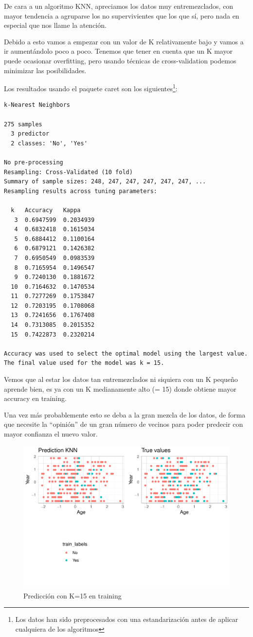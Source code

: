 De cara a un algoritmo KNN, apreciamos los datos muy entremezclados, con mayor tendencia a agruparse los no supervivientes que los que sí, pero nada en especial que nos llame la atención.

\vspace{\baselineskip}

Debido a esto vamos a empezar con un valor de K relativamente bajo y vamos a ir aumentándolo poco a poco. Tenemos que tener en cuenta que un K mayor puede ocasionar overfitting, pero usando técnicas de cross-validation podemos minimizar las posibilidades.

Los resultados usando el paquete caret son los siguientes\footnote{Los datos han sido preprocesados con una estandarización antes de aplicar cualquiera de los algoritmos}:
\begin{verbatim}
k-Nearest Neighbors 

275 samples
  3 predictor
  2 classes: 'No', 'Yes' 

No pre-processing
Resampling: Cross-Validated (10 fold) 
Summary of sample sizes: 248, 247, 247, 247, 247, 247, ... 
Resampling results across tuning parameters:

  k   Accuracy   Kappa    
   3  0.6947599  0.2034939
   4  0.6832418  0.1615034
   5  0.6884412  0.1100164
   6  0.6879121  0.1426382
   7  0.6950549  0.0983539
   8  0.7165954  0.1496547
   9  0.7240130  0.1881672
  10  0.7164632  0.1470534
  11  0.7277269  0.1753847
  12  0.7203195  0.1708068
  13  0.7241656  0.1767408
  14  0.7313085  0.2015352
  15  0.7422873  0.2320214

Accuracy was used to select the optimal model using the largest value.
The final value used for the model was k = 15.
\end{verbatim}

Vemos que al estar los datos tan entremezclados ni siquiera con un K pequeño aprende bien, es ya con un K medianamente alto (= 15) donde obtiene mayor accuracy en training.

Una vez más probablemente esto se deba a la gran mezcla de los datos, de forma que necesite la ``opinión'' de un gran número de vecinos para poder predecir con mayor confianza el nuevo valor.

\begin{figure}[H]\center\includegraphics[width=.9\linewidth]{img/Clasificacion_files/figure-latex/unnamed-chunk-10-1}\caption{Predicción con K=15 en training}\end{figure}

